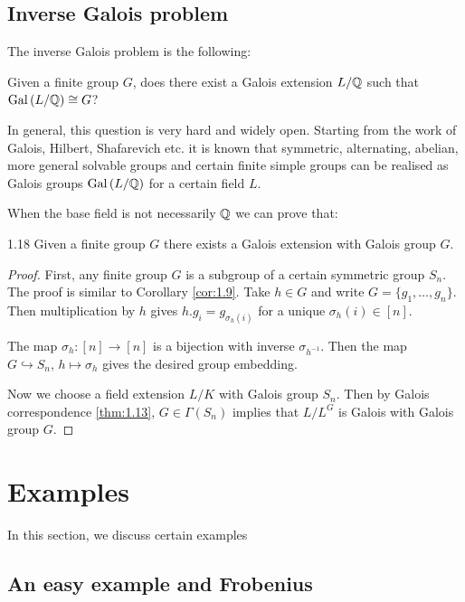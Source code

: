 \documentclass[twoside = false,	%
		headsepline,		%
		parskip = true,
		]{scrbook}						%
\begin{document}
        
        
    \subsection{Inverse Galois problem}
        The inverse Galois problem is the following:
        
        Given a finite group $G$, does there exist a Galois extension $L/\mathbb Q$ such that $\mathrm{Gal}\left( L/\mathbb Q\right) \cong G$?
        
        In general, this question is very hard and widely open. Starting from the work of Galois, Hilbert, Shafarevich etc. it is known that symmetric, alternating, abelian, more general solvable groups and certain finite simple groups can be realised as Galois groups $\mathrm{Gal}\left( L/\mathbb Q\right)$ for a certain field $L$.
        
        When the base field is not necessarily $\mathbb Q$ we can prove that:
        
        \begin{corollary}{}{1.18}
            Given a finite group $G$ there exists a Galois extension with Galois group $G$.
        \end{corollary}
        
        \begin{proof}
            First, any finite group $G$ is a subgroup of a certain symmetric group $S_n$. The proof is similar to Corollary \ref{cor:1.9}. Take $h \in G$ and write $G = \{g_1, \dots, g_n\}$. Then multiplication by $h$ gives $h.g_i = g_{\sigma_h(i)}$ for a unique $\sigma_h(i) \in [n]$.
            
            The map $\sigma_h: [n] \rightarrow [n]$ is a bijection with inverse $\sigma_{h^{-1}}$. Then the map $G \hookrightarrow S_n, \, h \mapsto \sigma_h$ gives the desired group embedding.
            
            Now we choose a field extension $L/K$ with Galois group $S_n$. Then by Galois correspondence \ref{thm:1.13}, $G \in \Gamma(S_n)$ implies that $L/L^G$ is Galois with Galois group $G$. 
        \end{proof}

\section{Examples}
    In this section, we discuss certain examples
    \subsection{An easy example and Frobenius}
    
\end{document}
